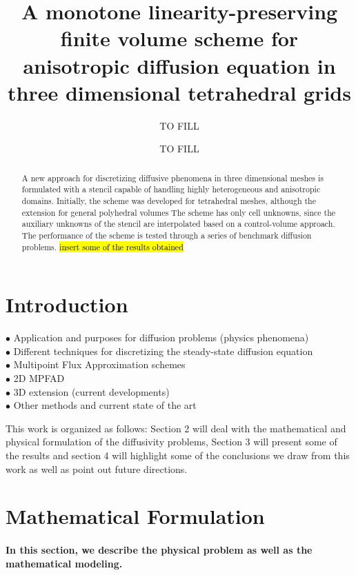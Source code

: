 \documentclass{article}
\title{A monotone linearity-preserving finite volume scheme for anisotropic diffusion equation in three dimensional tetrahedral grids}
\date{TO FILL}
\author{TO FILL}
\begin{document}
\maketitle
\newpage
{}

\begin{abstract} 
A new approach for discretizing diffusive phenomena in three dimensional meshes is formulated with a stencil capable of handling highly heterogeneous and anisotropic domains. Initially, the scheme was developed for tetrahedral meshes, although the extension for general polyhedral volumes The scheme has only cell unknowns, since the auxiliary unknowns of the stencil are interpolated based on a control-volume approach. The performance of the scheme is tested through a series of benchmark diffusion problems. \hl{insert some of the results obtained}
\end{abstract}

\newpage

\section{Introduction}
\begin{description}
\item[ $\bullet$ Application and purposes for diffusion problems (physics phenomena)]
\item[ $\bullet$ Different techniques for discretizing the steady-state diffusion equation]
\item[ $\bullet$ Multipoint Flux Approximation schemes]
\item[ $\bullet$ 2D MPFAD]
\item[ $\bullet$ 3D extension (current developments)]
\item[ $\bullet$ Other methods and current state of the art]
\end{description}

This work is organized as follows: Section 2 will deal with the mathematical and physical formulation of the diffusivity problems, Section 3 will present some of the results and section 4 will highlight some of the conclusions we draw from this work as well as point out future directions.

\section{Mathematical Formulation}
	\paragraph{In this section, we describe the physical problem as well as the mathematical modeling.} 
\end{document}
